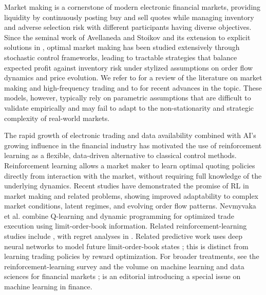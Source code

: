 \documentclass[11pt]{article}
\begin{document}
Market making is a cornerstone of modern electronic financial markets, providing liquidity by continuously posting buy and sell quotes while managing inventory and adverse selection risk with different participants having diverse objectives. Since the seminal work of Avellaneda and Stoikov \cite{avellaneda2008high} and its extension to explicit solutions in \cite{gueant2013dealing}, optimal market making has been studied extensively through stochastic control frameworks, leading to tractable strategies that balance expected profit against inventory risk under stylized assumptions on order flow dynamics and price evolution. We refer to \cite{cartea2015algorithmic} for a review of the literature on market making and high-frequency trading and to \cite{baldacci2021algorithmic,bellia2025market}  for recent advances in the topic. These models, however, typically rely on parametric assumptions that are difficult to validate empirically and may fail to adapt to the non-stationarity and strategic complexity of real-world markets.\vspace{0.5em}

The rapid growth of electronic trading and data availability combined with AI's growing influence in the financial industry has motivated the use of reinforcement learning as a flexible, data-driven alternative to classical control methods. Reinforcement learning allows a market maker to learn optimal quoting policies directly from interaction with the market, without requiring full knowledge of the underlying dynamics. Recent studies have demonstrated the promise of RL in market making and related problems, showing improved adaptability to complex market conditions, latent regimes, and evolving order flow patterns. {Nevmyvaka et al. \cite{nevmyvaka2006reinforcement} combine Q-learning and dynamic programming for optimized trade execution using limit-order-book information. Related reinforcement-learning studies include} {\cite{beysolow2019market,ning2021double,gavsperov2021market,gueant2019deep,jerome2023mbt,leal2022learning}, with regret analyses in \cite{cesa2024market,cao2024logarithmic}. Related predictive work uses deep neural networks to model future limit-order-book states \cite{sirignano2019deep}; this is distinct from learning trading policies by reward optimization.} For broader treatments, see the reinforcement-learning survey \cite{hambly2023recent} and the volume on machine learning and data sciences for financial markets \cite{capponi2023machine}; \cite{cuchiero2024special} is an editorial introducing a special issue on machine learning in finance.\vspace{0.5em}
\end{document}
